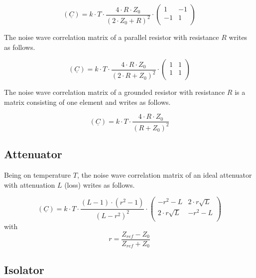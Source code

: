 \begin{equation}
(\underline{C}) = k\cdot T\cdot\frac{4\cdot R\cdot Z_0}{(2\cdot Z_0+R)^2}\cdot
\begin{pmatrix}
   1 & -1\\
  -1 &  1\\
\end{pmatrix}
\end{equation}

The noise wave correlation matrix of a parallel resistor with resistance $R$
writes as follows.

\begin{equation}
(\underline{C}) = k\cdot T\cdot\frac{4\cdot R\cdot Z_0}{(2\cdot R+Z_0)^2}\cdot
\begin{pmatrix}
  1 & 1\\
  1 & 1\\
\end{pmatrix}
\end{equation}

The noise wave correlation matrix of a grounded resistor with resistance $R$
is a matrix consisting of one element and writes as follows.

\begin{equation}
(\underline{C}) = k\cdot T\cdot\frac{4\cdot R\cdot Z_0}{(R+Z_0)^2}
\end{equation}


\subsection{Attenuator}

Being on temperature $T$, the noise wave correlation matrix of an
ideal attenuator with attenuation $L$ (loss) writes as follows.

\begin{equation}
(\underline{C}) = k\cdot T\cdot\frac{(L-1)\cdot(r^2-1)}{(L-r^2)^2}\cdot
\begin{pmatrix}
  -r^2-L           & 2\cdot r\sqrt{L}\\
  2\cdot r\sqrt{L} & -r^2-L\\
\end{pmatrix}
\end{equation}
with
\begin{equation}
r=\frac{Z_{ref}-Z_0}{Z_{ref}+Z_0}
\end{equation}


\subsection{Isolator}

